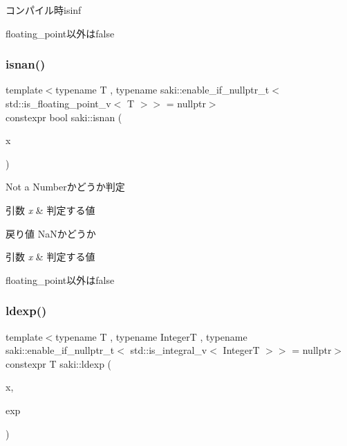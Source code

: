 コンパイル時isinf 

floating\+\_\+point以外はfalse \mbox{\label{namespacesaki_a446ca3f39e4dc8e57db4aafa03a4e232}} 
\subsubsection{\texorpdfstring{isnan()}{isnan()}}
{\footnotesize\ttfamily template$<$typename T , typename saki\+::enable\+\_\+if\+\_\+nullptr\+\_\+t$<$ std\+::is\+\_\+floating\+\_\+point\+\_\+v$<$ T $>$$>$  = nullptr$>$ \\
constexpr bool saki\+::isnan (\begin{DoxyParamCaption}\item[{T}]{x }\end{DoxyParamCaption})}



Not a Numberかどうか判定 


\begin{DoxyParams}{引数}
{\em x} & 判定する値 \\
\hline
\end{DoxyParams}
\begin{DoxyReturn}{戻り値}
Na\+Nかどうか
\end{DoxyReturn}

\begin{DoxyParams}{引数}
{\em x} & 判定する値\\
\hline
\end{DoxyParams}
floating\+\_\+point以外はfalse \mbox{\label{namespacesaki_a03b7a22945dcbce6e2bb0593025c90c4}} 
\subsubsection{\texorpdfstring{ldexp()}{ldexp()}}
{\footnotesize\ttfamily template$<$typename T , typename IntegerT , typename saki\+::enable\+\_\+if\+\_\+nullptr\+\_\+t$<$ std\+::is\+\_\+integral\+\_\+v$<$ Integer\+T $>$$>$  = nullptr$>$ \\
constexpr T saki\+::ldexp (\begin{DoxyParamCaption}\item[{T}]{x,  }\item[{IntegerT}]{exp }\end{DoxyParamCaption})}




